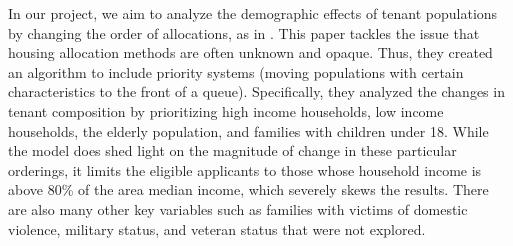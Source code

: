 \documentclass[11pt]{article}
\begin{document}
\newline
In our project, we aim to analyze the demographic effects of tenant populations by changing the order of allocations, as in \cite{nyuaffordablehousing}. This paper tackles the issue that housing allocation methods are often unknown and opaque. Thus, they created an algorithm to include priority systems (moving populations with certain characteristics to the front of a queue). Specifically, they analyzed the changes in tenant composition by prioritizing high income households, low income households, the elderly population, and families with children under 18. While the model does shed light on the magnitude of change in these particular orderings, it limits the eligible applicants to those whose household income is above 80\% of the area median income, which severely skews the results. There are also many other key variables such as families with victims of domestic violence, military status, and veteran status that were not explored.\\
\end{document}
